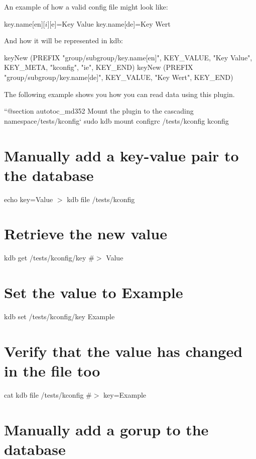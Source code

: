 An example of how a valid config file might look like\+:


\begin{DoxyCode}
[group][subgroup]
key.name[en][$i][$e]=Key Value
key.name[de]=Key Wert
\end{DoxyCode}


And how it will be represented in kdb\+:


\begin{DoxyCode}
keyNew (PREFIX "group/subgroup/key.name[en]", KEY\_VALUE, "Key Value", KEY\_META, "kconfig", "ie", KEY\_END)
keyNew (PREFIX "group/subgroup/key.name[de]", KEY\_VALUE, "Key Wert", KEY\_END)
\end{DoxyCode}


The following example shows you how you can read data using this plugin.

``{\ttfamily  @section autotoc\+\_\+md352 Mount the plugin to the cascading namespace}/tests/kconfig` sudo kdb mount configrc /tests/kconfig kconfig\hypertarget{autotoc_md350_autotoc_md353}{}\section{Manually add a key-\/value pair to the database}\label{autotoc_md350_autotoc_md353}
echo \textquotesingle{}key=Value\textquotesingle{} $>$ {\ttfamily kdb file /tests/kconfig}\hypertarget{autotoc_md350_autotoc_md354}{}\section{Retrieve the new value}\label{autotoc_md350_autotoc_md354}
kdb get /tests/kconfig/key \#$>$ Value\hypertarget{autotoc_md350_autotoc_md355}{}\section{Set the value to Example}\label{autotoc_md350_autotoc_md355}
kdb set /tests/kconfig/key Example\hypertarget{autotoc_md350_autotoc_md356}{}\section{Verify that the value has changed in the file too}\label{autotoc_md350_autotoc_md356}
cat {\ttfamily kdb file /tests/kconfig} \#$>$ key=Example\hypertarget{autotoc_md350_autotoc_md357}{}\section{Manually add a gorup to the database}\label{autotoc_md350_autotoc_md357}
